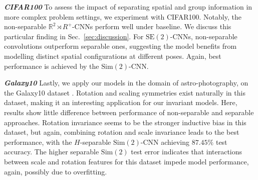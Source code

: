 \documentclass[nohyperref]{article}
\theoremstyle{plain}
\theoremstyle{definition}
\theoremstyle{remark}
\newcommand{\R}{\mathbb{R}}
\begin{document}
\begin{table*}[!htbp]
    \centering
    \caption{Test error (\%) on CIFAR10 with All-CNN-C architecture, for our separable group convolutions in comparison to other baselines: All-CNN-C \citep{springenberg2014striving}, $p4$- and $p4m$-G-CNN \citep{cohen2016group}. {\small$\dagger$ Separable along dilation and rotations dimensions.} {\small + Train-time augmentation by random horizontal flips and random cropping. $n$-$\mathrm{Sim(2)}$-CNNs where $n$ is the SIREN hidden size in units. $6$-$\mathrm{Sim(2)}$-CNNs have approximately equal numbers of parameters to the original All-CNN-C.}}
\label{tab:cifar10comp}
    \begin{small}
    \end{small}
\end{table*}

\textbf{\textit{CIFAR100}} To assess the impact of separating spatial and group information in more complex problem settings, we experiment with CIFAR100. Notably, the non-separable $\R^2 {\rtimes} R^+$-CNNs perform well under baseline. We discuss this particular finding in Sec.~\ref{sec:discussion}. For $\mathrm{SE(2)}$-CNNs, non-separable convolutions outperform separable ones, suggesting the model benefits from modelling distinct spatial configurations at different poses. Again, best performance is achieved by the $\mathrm{Sim(2)}$-CNN.


\textbf{\textit{Galaxy10}} Lastly, we apply our models in the domain of astro-photography, on the Galaxy10 dataset \citet{leung2019deep}. Rotation and scaling symmetries exist naturally in this dataset, making it an interesting application for our invariant models. Here, results show little difference between performance of non-separable and separable approaches. Rotation invariance seems to be the stronger inductive bias in this dataset, but again, combining rotation and scale invariance leads to the best performance, with the $H$-separable $\mathrm{Sim(2)}$-CNN achieving $87.45\%$ test accuracy. The higher separable $\mathrm{Sim(2)}$ test error indicates that interactions between scale and rotation features for this dataset impede model performance, again, possibly due to overfitting.
\end{document}
